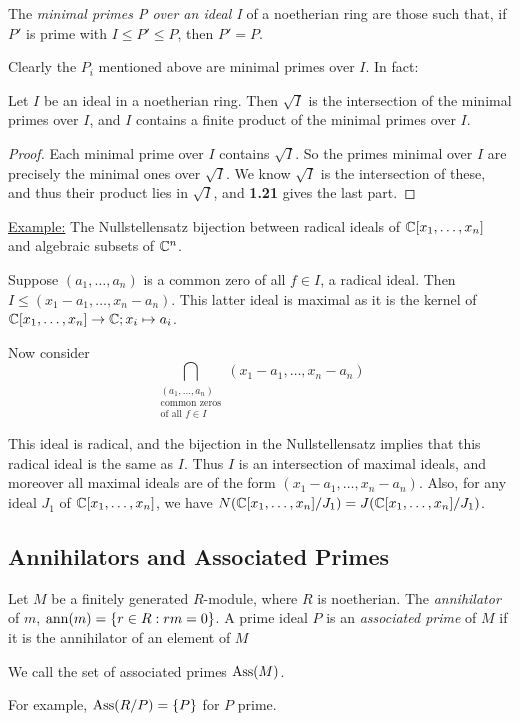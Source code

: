 \documentclass[10pt,a4paper]{article}
\begin{document}
\begin{definition}
  The \emph{minimal primes P over an ideal I} of a noetherian ring are those such that, if $P'$ is prime with $I \leq P' \leq P$, then $P' = P$.
\end{definition}
Clearly the $P_i$ mentioned above are minimal primes over $I$. In fact:

\begin{lemma}
  Let $I$ be an ideal in a noetherian ring. Then $\sqrt{I}$ is the intersection of the minimal primes over $I$, and $I$ contains a finite product of the minimal primes over $I$.
\end{lemma}
\begin{proof}
  Each minimal prime over $I$ contains $\sqrt{I}$. So the primes minimal over $I$ are precisely the minimal ones over $\sqrt{I}$. We know $\sqrt{I}$ is the intersection of these, and thus their product lies in $\sqrt{I}$, and \textbf{1.21} gives the last part.
\end{proof}

\underline{Example:} The Nullstellensatz bijection between radical ideals of $\mathbb{C}[x_1, \ldots, x_n]$ and algebraic subsets of $\mathbb{C}^n$.

Suppose $(a_1, \ldots, a_n)$ is a common zero of all $f\in I$, a radical ideal. Then $I \leq (x_1-a_1, \ldots, x_n-a_n)$. This latter ideal is maximal as it is the kernel of $\mathbb{C}[x_1, \ldots, x_n] \to \mathbb{C}; x_i \mapsto a_i$.

Now consider
\[\bigcap\limits_{\substack{(a_1, \ldots, a_n)\\\text{common zeros}\\\text{of all }f\in I}}(x_1-a_1, \ldots, x_n-a_n)\]

This ideal is radical, and the bijection in the Nullstellensatz implies that this radical ideal is the same as $I$. Thus $I$ is an intersection of maximal ideals, and moreover all maximal ideals are of the form $(x_1-a_1, \ldots, x_n-a_n)$. Also, for any ideal $J_1$ of $\mathbb{C}[x_1, \ldots, x_n]$, we have $N(\mathbb{C}[x_1, \ldots, x_n]/J_1) = J(\mathbb{C}[x_1, \ldots, x_n]/J_1)$.

\subsection{Annihilators and Associated Primes}
\begin{definition}
  Let $M$ be a finitely generated $R$-module, where $R$ is noetherian. The \emph{annihilator} of $m$, $\operatorname{ann}(m) = \{r \in R: rm=0\}$. A prime ideal $P$ is an \emph{associated prime} of $M$ if it is the annihilator of an element of $M$

  We call the set of associated primes $\operatorname{Ass}(M)$.
\end{definition}
For example, $\operatorname{Ass}(R/P) = \{P\}$ for $P$ prime.
\end{document}
